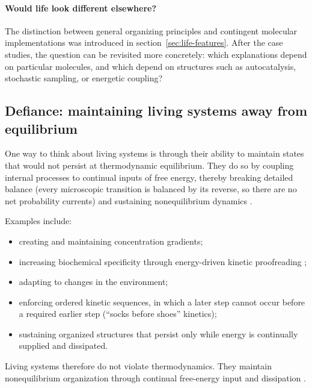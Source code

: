 \paragraph{Would life look different elsewhere?}
\label{sec:elsewhere}
The distinction between general organizing principles and contingent molecular implementations was introduced in section~\ref{sec:life-features}.
After the case studies, the question can be revisited more concretely: which explanations depend on particular molecules, and which depend on structures such as autocatalysis, stochastic sampling, or energetic coupling?
\subsection{Defiance: maintaining living systems away from equilibrium}
\label{sec:defiance}


One way to think about living systems is through their ability to maintain states that would not persist at thermodynamic equilibrium.
They do so by coupling internal processes to continual inputs of free energy, thereby breaking detailed balance (every microscopic transition is balanced by its reverse, so there are no net probability currents) and sustaining nonequilibrium dynamics \cite{gnesotto2018broken}.

Examples include:

\begin{itemize}
    \item creating and maintaining concentration gradients;
    \item increasing biochemical specificity through energy-driven kinetic proofreading \cite{hopfield1974kinetic};
    \item adapting to changes in the environment;
    \item enforcing ordered kinetic sequences, in which a later step cannot occur before a required earlier step (``socks before shoes'' kinetics);
    \item sustaining organized structures that persist only while energy is continually supplied and dissipated.
\end{itemize}

Living systems therefore do not violate thermodynamics.
They maintain nonequilibrium organization through continual free-energy input and dissipation \cite{gnesotto2018broken}.


